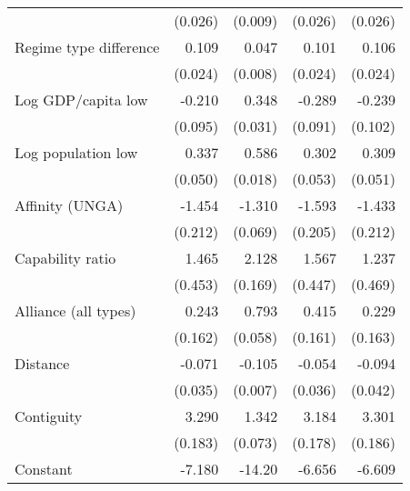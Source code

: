 \begin{table}[htbp]
\begin{tabular}{l*{4}{D{.}{.}{-1}}}
   &     (0.026)         &     (0.009)         &     (0.026)         &     (0.026)         \\
\addlinespace
Regime type difference&       0.109\sym{***}&      0.047\sym{***}&       0.101\sym{***}&       0.106\sym{***}\\
   &     (0.024)         &     (0.008)         &     (0.024)         &     (0.024)         \\
\addlinespace
Log GDP/capita low&      -0.210\sym{*}  &       0.348\sym{***}&      -0.289\sym{**} &      -0.239\sym{*}  \\
   &     (0.095)         &     (0.031)         &     (0.091)         &     (0.102)         \\
\addlinespace
Log population low&       0.337\sym{***}&       0.586\sym{***}&       0.302\sym{***}&       0.309\sym{***}\\
   &     (0.050)         &     (0.018)         &     (0.053)         &     (0.051)         \\
\addlinespace
Affinity (UNGA) &      -1.454\sym{***}&      -1.310\sym{***}&      -1.593\sym{***}&      -1.433\sym{***}\\
   &     (0.212)         &     (0.069)         &     (0.205)         &     (0.212)         \\
\addlinespace
Capability ratio&       1.465\sym{**} &       2.128\sym{***}&       1.567\sym{***}&       1.237\sym{**} \\
   &     (0.453)         &     (0.169)         &     (0.447)         &     (0.469)         \\
\addlinespace
Alliance (all types)&       0.243         &       0.793\sym{***}&       0.415\sym{*}  &       0.229         \\
   &     (0.162)         &     (0.058)         &     (0.161)         &     (0.163)         \\
\addlinespace
Distance &     -0.071\sym{*}  &      -0.105\sym{***}&     -0.054         &     -0.094\sym{*}  \\
   &     (0.035)         &     (0.007)         &     (0.036)         &     (0.042)         \\
\addlinespace
Contiguity&       3.290\sym{***}&       1.342\sym{***}&       3.184\sym{***}&       3.301\sym{***}\\
   &     (0.183)         &     (0.073)         &     (0.178)         &     (0.186)         \\
\addlinespace
Constant&      -7.180\sym{***}&      -14.20\sym{***}&      -6.656\sym{***}&      -6.609\sym{***}\\

\end{tabular}
\end{table}

